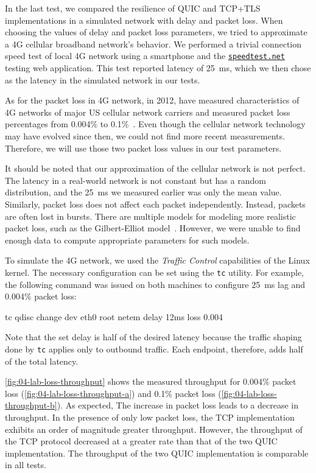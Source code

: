 In the last test, we compared the resilience of QUIC and TCP+TLS implementations in a simulated
network with delay and packet loss. When choosing the values of delay and packet loss parameters, we
tried to approximate a 4G cellular broadband network's behavior. We performed a trivial connection
speed test of local 4G network using a smartphone and the
\href{https://speedtest.net}{\texttt{speedtest.net}} testing web application. This test reported
latency of \SI{25}{\milli\second}, which we then chose as the latency in the simulated network in
our tests.

As for the packet loss in 4G network, in 2012, \citeauthor{measuring4G} have measured
characteristics of 4G networks of major US cellular network carriers and measured packet loss
percentages from 0.004\% to 0.1\%~\cite{measuring4G}. Even though the cellular network technology
may have evolved since then, we could not find more recent measurements. Therefore, we will use
those two packet loss values in our test parameters.

It should be noted that our approximation of the cellular network is not perfect. The latency in a
real-world network is not constant but has a random distribution, and the \SI{25}{\milli\second} we
measured earlier was only the mean value. Similarly, packet loss does not affect each packet
independently. Instead, packets are often lost in bursts. There are multiple models for modeling
more realistic packet loss, such as the Gilbert-Elliot model~\cite{wiki:burst-error}. However, we
were unable to find enough data to compute appropriate parameters for such models.

To simulate the 4G network, we used the \textit{Traffic Control} capabilities of the Linux kernel.
The necessary configuration can be set using the \texttt{tc} utility. For example, the following
command was issued on both machines to configure \SI{25}{\milli\second} lag and 0.004\% packet loss:

\begin{myVerbatim}
tc qdisc change dev eth0 root netem delay 12ms loss 0.004%
\end{myVerbatim}

Note that the set delay is half of the desired latency because the traffic shaping done by
\texttt{tc} applies only to outbound traffic. Each endpoint, therefore, adds half of the total
latency.

\autoref{fig:04-lab-loss-throughput} shows the measured throughput for 0.004\% packet loss
(\autoref{fig:04-lab-loss-throughput-a}) and 0.1\% packet loss
(\autoref{fig:04-lab-loss-throughput-b}). As expected, The increase in packet loss leads to a
decrease in throughput. In the presence of only low packet loss, the TCP implementation exhibits an
order of magnitude greater throughput. However, the throughput of the TCP protocol decreased at a
greater rate than that of the two QUIC implementation. The throughput of the two QUIC implementation
is comparable in all tests.

